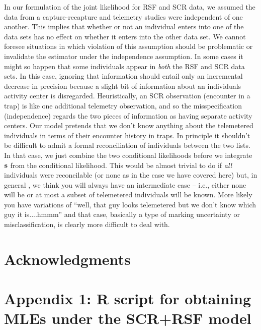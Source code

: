 \documentclass[12pt]{article}
\begin{document}
In our formulation of the joint likelihood for RSF and SCR data, we
assumed the data from a capture-recapture and telemetry studies were
independent of one another. This implies that whether or not an
individual enters into one of the data sets has no effect on whether
it enters into the other data set. We cannot foresee situations in
which violation of this assumption should be problematic or invalidate
the estimator under the independence assumption.  In some cases it
might so happen that some individuals appear in {\it both} the RSF and
SCR data sets. In this case, ignoring that information should entail
only an incremental decrease in precision because a slight bit of
information about an individuals activity center is
disregarded. Heuristically, an SCR observation (encounter in a trap)
is like one additional telemetry observation, and so the
misspecification (independence)
regards the
two pieces of information as having separate activity centers.
 Our model pretends that we don't know anything
about the telemetered individuals in terms of their encounter history
in traps.  In principle it shouldn't be difficult to admit a formal
reconciliation of individuals between the two lists. In that case, we
just combine the two conditional likelihoods before we integrate ${\bf
  s}$ from the conditional likelihood. This would be almost trivial to
do if {\it all} individuals were reconcilable (or none as in the case
we have covered here) but, in general , we think you will always have
an intermediate case -- i.e., either none will be or at most a subset
of telemetered individuals will be known. More likely you have variations of ``well, that
guy looks telemetered but we don't know which guy it is....hmmm'' and
that case, basically a type of marking uncertainty or
misclassification, is clearly more difficult to deal with.


\section*{Acknowledgments}






\section*{Appendix 1: {\bf R} script for obtaining MLEs under the SCR+RSF model}
\end{document}
